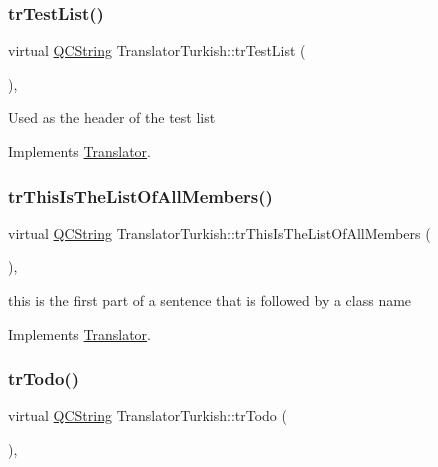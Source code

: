 \subsubsection{\texorpdfstring{trTestList()}{trTestList()}}
{\footnotesize\ttfamily virtual \mbox{\hyperlink{class_q_c_string}{Q\+C\+String}} Translator\+Turkish\+::tr\+Test\+List (\begin{DoxyParamCaption}{ }\end{DoxyParamCaption})\hspace{0.3cm}{\ttfamily [inline]}, {\ttfamily [virtual]}}

Used as the header of the test list 

Implements \mbox{\hyperlink{class_translator}{Translator}}.

\mbox{\label{class_translator_turkish_a029690f80d0870be65cc17c907d2fe63}} 
\subsubsection{\texorpdfstring{trThisIsTheListOfAllMembers()}{trThisIsTheListOfAllMembers()}}
{\footnotesize\ttfamily virtual \mbox{\hyperlink{class_q_c_string}{Q\+C\+String}} Translator\+Turkish\+::tr\+This\+Is\+The\+List\+Of\+All\+Members (\begin{DoxyParamCaption}{ }\end{DoxyParamCaption})\hspace{0.3cm}{\ttfamily [inline]}, {\ttfamily [virtual]}}

this is the first part of a sentence that is followed by a class name 

Implements \mbox{\hyperlink{class_translator}{Translator}}.

\mbox{\label{class_translator_turkish_a35ccf704dca528bc027c6ec8e951f346}} 
\subsubsection{\texorpdfstring{trTodo()}{trTodo()}}
{\footnotesize\ttfamily virtual \mbox{\hyperlink{class_q_c_string}{Q\+C\+String}} Translator\+Turkish\+::tr\+Todo (\begin{DoxyParamCaption}{ }\end{DoxyParamCaption})\hspace{0.3cm}{\ttfamily [inline]}, {\ttfamily [virtual]}}

